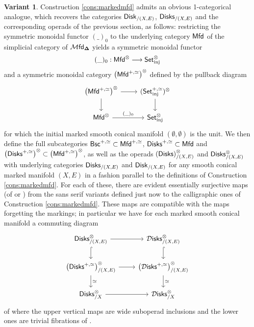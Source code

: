 \documentclass[10pt, reqno, twoside
, final
]{amsart}
\numberwithin{equation}{subsection}%
\theoremstyle{definition}
\theoremstyle{definition}
\theoremstyle{definition}
\theoremstyle{definition}
\theoremstyle{definition}
\theoremstyle{definition}
\theoremstyle{definition}
\newtheorem{var}[defn]{Variant}
\theoremstyle{definition}
\theoremstyle{definition}
\theoremstyle{plain}
\theoremstyle{definition}
\theoremstyle{plain}
\theoremstyle{definition}
\theoremstyle{plain}
\theoremstyle{definition}
\theoremstyle{definition}
\theoremstyle{plain}
\theoremstyle{plain}
\theoremstyle{definition}
\theoremstyle{plain}
\theoremstyle{plain}
\theoremstyle{plain}
\begin{document}
\begin{var}\label{var:discreteops}
Construction \ref{cons:markedmfd} admits an obvious 1-categorical analogue, which recovers the categories $\mathsf{Disk}_{/(X,E)}$, $\mathsf{Disks}_{/(X,E)}$ and the corresponding operads of the previous section, as follows: restricting the symmetric monoidal functor $(\_)_0$ to the underlying category $\mathsf{Mfd}$ of the simplicial category of $\mathcal{M}\mathsf{fd}_{\boldsymbol{\Delta}}$ yields a symmetric monoidal functor
\[  (\_)_0:\mathsf{Mfd}^{\otimes} \longrightarrow \mathsf{Set}^{\otimes}_{\mathrm{inj}} \]
and a symmetric monoidal category $\left(\mathsf{Mfd}^{+,\simeq}\right)^{\otimes}$ defined by the pullback diagram
\[
\begin{tikzcd}
\left(\mfd^{+,\simeq}\right)^{\otimes} \ar[d] \ar[r] & (\set_{\mathrm{inj}}^{+,\simeq})^{\otimes} \ar[d] \\
\mfd^{\otimes} \ar[r,"(\_)_0"] & \set_{\mathrm{inj}}^{\otimes}
\end{tikzcd}
\]
for which the initial marked smooth conical manifold $(\emptyset,\emptyset)$ is the unit. We then define the full subcategories $\mathsf{Bsc}^{+,\simeq}\subset \mathsf{Mfd}^{+,\simeq}$, $\mathsf{Disks}^{+,\simeq}\subset \mathsf{Mfd}$ and $\left(\mathsf{Disks}^{+,\simeq}\right)^{\otimes}\subset \left(\mathsf{Mfd}^{+,\simeq}\right)^{\otimes}$, as well as the operads $\left(\mathsf{Disks}\right)^{\otimes}_{/(X,E)}$ and $\mathsf{Disks}^{\otimes}_{/(X,E)}$ with underlying categories $\mathsf{Disks}_{/(X,E)}$ and $\mathsf{Disk}_{/(X,E)}$ for any smooth conical marked manifold $(X,E)$ in a fashion parallel to the definitions of Construction \ref{cons:markedmfd}. For each of these, there are evident essentially surjective maps (of \infcats or \infopst) from the sans serif variants defined just now to the calligraphic ones of Construction \ref{cons:markedmfd}. These maps are compatible with the maps forgetting the markings; in particular we have for each marked smooth conical manifold a commuting diagram 
\begin{equation*}
\begin{tikzcd}
 \disks^{\otimes}_{/(X,E)} \ar[d,hook] \ar[r]  &\infdisks^{\otimes}_{/(X,E)}\ar[d,hook] \\
 \left(\disks^{+,\simeq}\right)^{\otimes}_{/(X,E)} \ar[d,"\simeq"] \ar[r]  &\left(\infdisks^{+,\simeq}\right)^{\otimes}_{/(X,E)}\ar[d,"\simeq"] \\
 \disks^{\otimes}_{/X}  \ar[r]  &\infdisks^{\otimes}_{/X} 
\end{tikzcd}
\end{equation*}
of \infops where the upper vertical maps are wide suboperad inclusions and the lower ones are trivial fibrations of \infopst.
\end{var}
\end{document}
